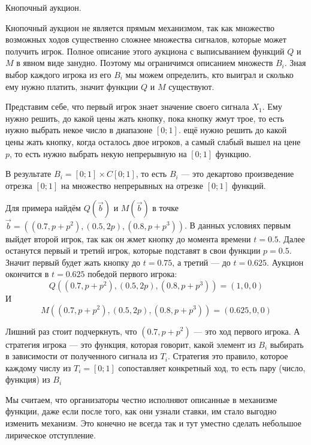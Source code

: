 \begin{myex} Кнопочный аукцион.

Кнопочный аукцион не является прямым механизмом, так как множество возможных ходов существенно сложнее множества сигналов, которые может получить игрок. Полное описание этого аукциона с выписыванием функций $ Q $ и $ M $ в явном виде  занудно. Поэтому мы ограничимся описанием множеств $ B_{i} $. Зная выбор каждого игрока из его $ B_{i} $ мы можем определить, кто выиграл и сколько ему нужно платить, значит функции $ Q $ и $ M $ существуют.

Представим себе, что первый игрок знает значение  своего сигнала $ X_{1} $. Ему нужно решить, до какой цены жать кнопку, пока кнопку жмут трое, то есть нужно выбрать некое число в диапазоне $ [0;1] $. ещё нужно решить до какой цены жать кнопку, когда осталось двое игроков, а самый слабый вышел на цене $ p $, то есть нужно выбрать некую непрерывную на $ [0;1] $ функцию.

В результате $ B_{i}=[0;1]\times C[0;1] $, то есть $ B_{i} $ — это декартово произведение отрезка $ [0;1] $ на множество непрерывных на отрезке $ [0;1] $ функций.

Для примера найдём $ Q(\vec{b})$ и $ M(\vec{b}) $ в точке  $\vec{b}=((0.7,p+p^{2}),(0.5,2p),(0.8,p+p^{3})) $. В данных условиях первым выйдет второй игрок, так как он жмет кнопку до момента времени $ t=0.5 $. Далее останутся первый и третий игрок, которые подставят в свои функции $ p=0.5 $. Значит первый будет жать кнопку до $ t=0.75 $, а третий — до $ t=0.625 $. Аукцион окончится в $ t=0.625 $ победой первого игрока:
\begin{equation}
Q((0.7,p+p^{2}),(0.5,2p),(0.8,p+p^{3}))=(1,0,0)
\end{equation}
И
\begin{equation}
M((0.7,p+p^{2}),(0.5,2p),(0.8,p+p^{3}))=(0.625,0,0)
\end{equation}

Лишний раз стоит подчеркнуть, что $ (0.7,p+p^{2}) $ — это ход первого игрока. А стратегия игрока — это функция, которая говорит, какой элемент из $ B_{i} $ выбирать в зависимости от полученного сигнала из $ T_{i} $. Стратегия это правило, которое каждому числу из $ T_{i}=[0;1] $ сопоставляет конкретный ход, то есть пару (число, функция) из $ B_{i} $

\end{myex}

Мы считаем, что организаторы честно исполняют описанные в механизме функции, даже если после того, как они узнали ставки, им стало выгодно изменить механизм. Это конечно не всегда так и тут уместно сделать небольшое лирическое отступление.

